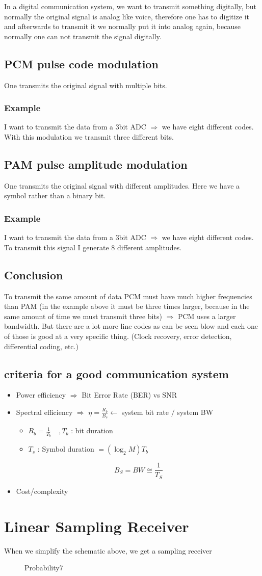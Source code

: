 In a digital communication system, we want to transmit something digitally, but normally the original signal is analog like voice, therefore one has to digitize it and afterwards to transmit it we normally put it into analog again, because normally one can not transmit the signal digitally.
\subsection{PCM pulse code modulation}
One transmits the original signal with multiple bits.
\subsubsection{Example}
I want to transmit the data from a 3bit ADC $\Rightarrow$ we have eight different codes. With this modulation we transmit three different bits.
\subsection{PAM pulse amplitude modulation}
One transmits the original signal with different amplitudes. Here we have a symbol rather than a binary bit.
\subsubsection{Example}
I want to transmit the data from a 3bit ADC $\Rightarrow$ we have eight different codes. To transmit this signal I generate 8 different amplitudes.
\subsection{Conclusion}
To transmit the same amount of data PCM must have much higher frequencies than PAM (in the example above it must be three times larger, because in the same amount of time we must transmit three bits) $\Rightarrow$ PCM uses a larger bandwidth. But there are a lot more line codes as can be seen blow and each one of those is good at a very specific thing. (Clock recovery, error detection, differential coding, etc.)
\subsection{criteria for a good communication system}
\begin{itemize}
\item Power efficiency $\Rightarrow$ Bit Error Rate (BER) vs SNR
\item Spectral efficiency $\Rightarrow$ $\eta=\frac{R_b}{B_s} \leftarrow$ system bit rate $/$ system BW 
\begin{itemize}
\item $R_b=\frac{1}{T_b} \quad, T_b$ : bit duration
\item $T_s$ : Symbol duration $=\left(\log _2 M\right) T_b$ 
\end{itemize}
$$B_S=B W \cong \frac{1}{T_S}$$
\item Cost/complexity
\end{itemize}

\section{Linear Sampling Receiver}
When we simplify the schematic above, we get a sampling receiver
\begin{figure}[ht]
  \centering
  \caption{Probability7}
  \label{fig:probability_7}
\end{figure}